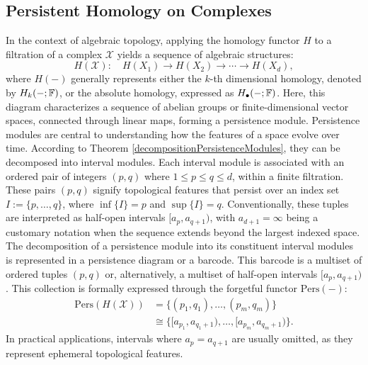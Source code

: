 \subsection{Persistent Homology on Complexes}
\label{PersistentHomologyonComplexes}
In the context of algebraic topology, applying the homology functor $H$
to a filtration of a complex $\mathcal{X}$ yields a sequence of algebraic structures:
\begin{equation}
	H(\mathcal{X}): \quad H(X_{1}) \to H(X_{2}) \to \cdots
	\to H(X_{d}),
\end{equation}
where $H(-)$ generally represents either the $k$-th dimensional
homology, denoted by $H_{k}(-;{\mathbb{F}})$, or the absolute homology, expressed as $H
_{\bullet}(-;{\mathbb{F}})$. Here, this diagram characterizes a sequence of abelian
groups or finite-dimensional vector spaces, connected through linear maps, forming a persistence module. Persistence modules are central to understanding how the features of a space evolve
over time. According to Theorem \ref{decompositionPersistenceModules}, they can be decomposed into interval modules. Each interval module is associated with an
ordered pair of integers $(p,q)$ where $1 \leq p \leq q \leq d$, within a finite
filtration. These pairs $(p,q)$ signify topological features that persist over an
index set $I := \{p, \ldots, q\}$, where $\inf\{I\} = p$ and $\sup\{I\} = q$. Conventionally,
these tuples are interpreted as half-open intervals $[a_{p}, a_{q+1})$, with $a_{d+1}
= \infty$ being a customary notation when the sequence extends beyond the largest
indexed space. The decomposition of a persistence module into its constituent interval modules is
represented in a persistence diagram or a barcode. This barcode is a multiset of ordered tuples $(p,q)$ or, alternatively, a multiset
of half-open intervals $[a_{p}, a_{q+1})$. This collection is formally expressed
through the forgetful functor $\mathrm{Pers}(-)$:
\begin{align}
    \mathrm{Pers}(H(\mathcal{X})) & = \{(p_{1},q_{1}), \ldots, (p_{m},q_{m})\}                    \\
                                           & \cong \{[a_{p_1}, a_{q_1+1}), \ldots, [a_{p_m}, a_{q_m+1})\}.
\end{align}
In practical applications, intervals where $a_{p} = a_{q+1}$ are usually omitted,
as they represent ephemeral topological features.

